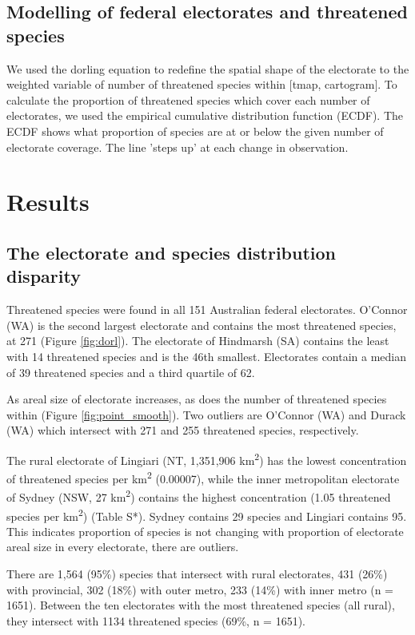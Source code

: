 \documentclass[a4paper,11pt]{article}
\begin{document}
\subsection{Modelling of federal electorates and threatened species}

We used the dorling equation to redefine the spatial shape of the electorate to the weighted variable of number of threatened species within [tmap, cartogram].
To calculate the proportion of threatened species which cover each number of electorates, we used the empirical cumulative distribution function (ECDF). The ECDF shows what proportion of species are at or below the given number of electorate coverage. The line 'steps up' at each change in observation.

\section{Results}

\subsection{The electorate and species distribution disparity}

Threatened species were found in all 151 Australian federal electorates. O'Connor (WA) is the second largest electorate and contains the most threatened species, at 271 (Figure \ref{fig:dorl}). The electorate of Hindmarsh (SA) contains the least with 14 threatened species and is the 46th smallest. Electorates contain a median of 39 threatened species and a third quartile of 62.

As areal size of electorate increases, as does the number of threatened species within (Figure \ref{fig:point_smooth}). Two outliers are O'Connor (WA) and Durack (WA) which intersect with 271 and 255 threatened species, respectively.

The rural electorate of Lingiari (NT, 1,351,906 km\textsuperscript{2}) has the lowest concentration of threatened species per km\textsuperscript{2} (0.00007), while the inner metropolitan electorate of Sydney (NSW, 27 km\textsuperscript{2}) contains the highest concentration (1.05 threatened species per km\textsuperscript{2}) (Table S*). Sydney contains 29 species and Lingiari contains 95. This indicates proportion of species is not changing with proportion of electorate areal size in every electorate, there are outliers.

There are 1,564 (95\%) species that intersect with rural electorates, 431 (26\%) with provincial, 302 (18\%) with outer metro, 233 (14\%) with inner metro (n = 1651). Between the ten electorates with the most threatened species (all rural), they intersect with 1134 threatened species (69\%, n = 1651).
\end{document}
